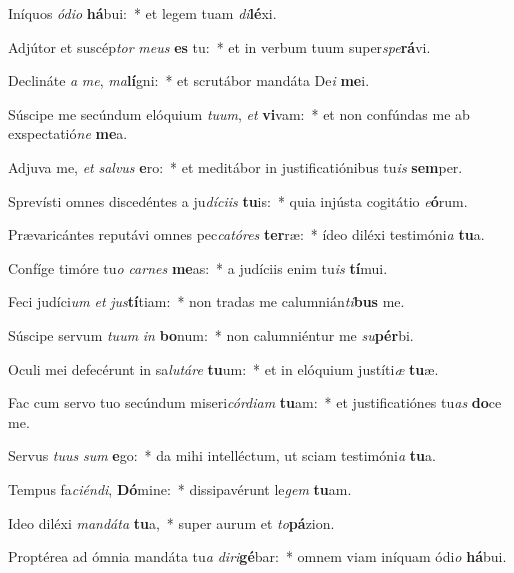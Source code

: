 \item Iníquos \textit{ó}\textit{di}\textit{o} \textbf{há}bui:~* et legem tuam \textit{di}\textbf{lé}xi.
\item Adjútor et suscép\textit{tor} \textit{me}\textit{us} \textbf{es} tu:~* et in verbum tuum super\textit{spe}\textbf{rá}vi.
\item Declináte \textit{a} \textit{me}, \textit{ma}\textbf{lí}gni:~* et scrutábor mandáta De\textit{i} \textbf{me}i.
\item Súscipe me secúndum elóquium \textit{tu}\textit{um}, \textit{et} \textbf{vi}vam:~* et non confúndas me ab exspectatió\textit{ne} \textbf{me}a.
\item Adjuva me, \textit{et} \textit{sal}\textit{vus} \textbf{e}ro:~* et meditábor in justificatiónibus tu\textit{is} \textbf{sem}per.
\item Sprevísti omnes discedéntes a ju\textit{dí}\textit{ci}\textit{is} \textbf{tu}is:~* quia injústa cogitátio \textit{e}\textbf{ó}rum.
\item Prævaricántes reputávi omnes pec\textit{ca}\textit{tó}\textit{res} \textbf{ter}ræ:~* ídeo diléxi testimóni\textit{a} \textbf{tu}a.
\item Confíge timóre tu\textit{o} \textit{car}\textit{nes} \textbf{me}as:~* a judíciis enim tu\textit{is} \textbf{tí}mui.
\item Feci judíci\textit{um} \textit{et} \textit{jus}\textbf{tí}tiam:~* non tradas me calumnián\textit{ti}\textbf{bus} me.
\item Súscipe servum \textit{tu}\textit{um} \textit{in} \textbf{bo}num:~* non calumniéntur me \textit{su}\textbf{pér}bi.
\item Oculi mei defecérunt in sa\textit{lu}\textit{tá}\textit{re} \textbf{tu}um:~* et in elóquium justíti\textit{æ} \textbf{tu}æ.
\item Fac cum servo tuo secúndum miseri\textit{cór}\textit{di}\textit{am} \textbf{tu}am:~* et justificatiónes tu\textit{as} \textbf{do}ce me.
\item Servus \textit{tu}\textit{us} \textit{sum} \textbf{e}go:~* da mihi intelléctum, ut sciam testimóni\textit{a} \textbf{tu}a.
\item Tempus fa\textit{ci}\textit{én}\textit{di}, \textbf{Dó}mine:~* dissipavérunt le\textit{gem} \textbf{tu}am.
\item Ideo diléxi \textit{man}\textit{dá}\textit{ta} \textbf{tu}a,~* super aurum et \textit{to}\textbf{pá}zion.
\item Proptérea ad ómnia mandáta tu\textit{a} \textit{di}\textit{ri}\textbf{gé}bar:~* omnem viam iníquam ódi\textit{o} \textbf{há}bui.
